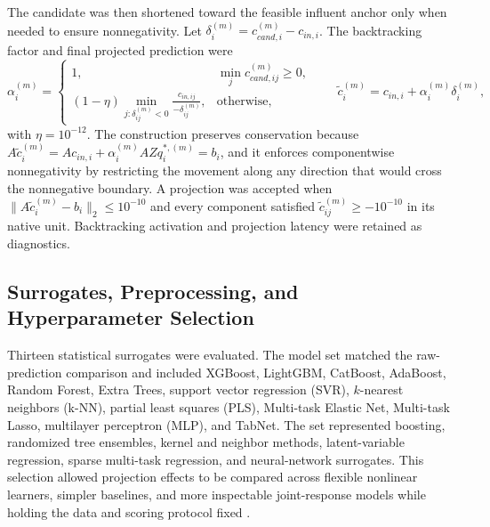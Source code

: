 \documentclass[12pt, twoside]{book}
\begin{document}
The candidate was then shortened toward the feasible influent anchor only when needed to ensure
nonnegativity. Let \(\delta_i^{(m)}=c_{cand,i}^{(m)}-c_{in,i}\). The backtracking factor and final projected
prediction were
\begin{equation}
\label{eq:ch2_backtracking}
\alpha_i^{(m)}=
\begin{cases}
1, & \min_j c_{cand,ij}^{(m)}\geq0,\\
(1-\eta)\displaystyle\min_{j:\delta_{ij}^{(m)}<0}
\frac{c_{in,ij}}{-\delta_{ij}^{(m)}}, & \text{otherwise},
\end{cases}
\qquad
\tilde c_i^{(m)}=c_{in,i}+\alpha_i^{(m)}\delta_i^{(m)},
\end{equation}
with \(\eta=10^{-12}\). The construction preserves conservation because
\(A\tilde c_i^{(m)}=Ac_{in,i}+\alpha_i^{(m)}AZq_i^{*,(m)}=b_i\), and it enforces componentwise
nonnegativity by restricting the movement along any direction that would cross the nonnegative boundary. A
projection was accepted when \(\|A\tilde c_i^{(m)}-b_i\|_2\leq10^{-10}\) and every component satisfied
\(\tilde c_{ij}^{(m)}\geq-10^{-10}\) in its native unit. Backtracking activation and projection latency were
retained as diagnostics.

\subsection{Surrogates, Preprocessing, and Hyperparameter Selection}

Thirteen statistical surrogates were evaluated. The model set matched the raw-prediction comparison and
included XGBoost, LightGBM, CatBoost, AdaBoost, Random Forest, Extra Trees, support vector regression (SVR),
\(k\)-nearest neighbors (k-NN), partial least squares (PLS), Multi-task Elastic Net, Multi-task Lasso,
multilayer perceptron (MLP), and TabNet. The set represented boosting, randomized tree ensembles, kernel and
neighbor methods, latent-variable regression, sparse multi-task regression, and neural-network surrogates. This
selection allowed projection effects to be compared across flexible nonlinear learners, simpler baselines, and
more inspectable joint-response models while holding the data and scoring protocol fixed
\citep{Breiman2001,ChenGuestrin2016,Wold2001,ArikPfister2021,Borisov2024}.
\end{document}
